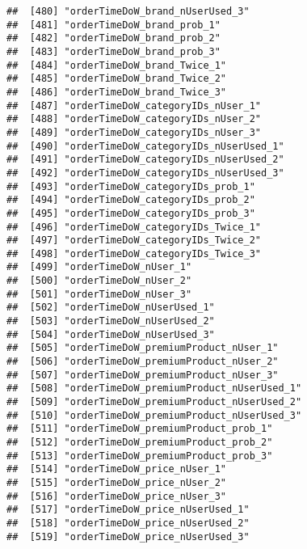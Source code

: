 \documentclass[10pt]{report}
\begin{document}
\begin{verbatim}
##  [480] "orderTimeDoW_brand_nUserUsed_3"                       
##  [481] "orderTimeDoW_brand_prob_1"                            
##  [482] "orderTimeDoW_brand_prob_2"                            
##  [483] "orderTimeDoW_brand_prob_3"                            
##  [484] "orderTimeDoW_brand_Twice_1"                           
##  [485] "orderTimeDoW_brand_Twice_2"                           
##  [486] "orderTimeDoW_brand_Twice_3"                           
##  [487] "orderTimeDoW_categoryIDs_nUser_1"                     
##  [488] "orderTimeDoW_categoryIDs_nUser_2"                     
##  [489] "orderTimeDoW_categoryIDs_nUser_3"                     
##  [490] "orderTimeDoW_categoryIDs_nUserUsed_1"                 
##  [491] "orderTimeDoW_categoryIDs_nUserUsed_2"                 
##  [492] "orderTimeDoW_categoryIDs_nUserUsed_3"                 
##  [493] "orderTimeDoW_categoryIDs_prob_1"                      
##  [494] "orderTimeDoW_categoryIDs_prob_2"                      
##  [495] "orderTimeDoW_categoryIDs_prob_3"                      
##  [496] "orderTimeDoW_categoryIDs_Twice_1"                     
##  [497] "orderTimeDoW_categoryIDs_Twice_2"                     
##  [498] "orderTimeDoW_categoryIDs_Twice_3"                     
##  [499] "orderTimeDoW_nUser_1"                                 
##  [500] "orderTimeDoW_nUser_2"                                 
##  [501] "orderTimeDoW_nUser_3"                                 
##  [502] "orderTimeDoW_nUserUsed_1"                             
##  [503] "orderTimeDoW_nUserUsed_2"                             
##  [504] "orderTimeDoW_nUserUsed_3"                             
##  [505] "orderTimeDoW_premiumProduct_nUser_1"                  
##  [506] "orderTimeDoW_premiumProduct_nUser_2"                  
##  [507] "orderTimeDoW_premiumProduct_nUser_3"                  
##  [508] "orderTimeDoW_premiumProduct_nUserUsed_1"              
##  [509] "orderTimeDoW_premiumProduct_nUserUsed_2"              
##  [510] "orderTimeDoW_premiumProduct_nUserUsed_3"              
##  [511] "orderTimeDoW_premiumProduct_prob_1"                   
##  [512] "orderTimeDoW_premiumProduct_prob_2"                   
##  [513] "orderTimeDoW_premiumProduct_prob_3"                   
##  [514] "orderTimeDoW_price_nUser_1"                           
##  [515] "orderTimeDoW_price_nUser_2"                           
##  [516] "orderTimeDoW_price_nUser_3"                           
##  [517] "orderTimeDoW_price_nUserUsed_1"                       
##  [518] "orderTimeDoW_price_nUserUsed_2"                       
##  [519] "orderTimeDoW_price_nUserUsed_3"                       

\end{verbatim}
\end{document}
